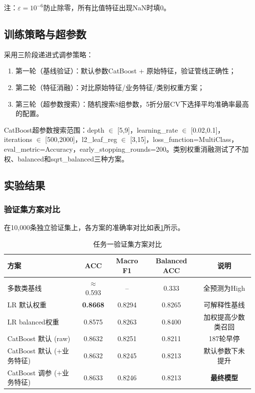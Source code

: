 注：$\varepsilon = 10^{-6}$防止除零，所有比值特征出现NaN时填0。

\subsection{训练策略与超参数}

采用三阶段递进式调参策略：
\begin{enumerate}[itemsep=0pt]
\item 第一轮（基线验证）：默认参数CatBoost + 原始特征，验证管线正确性；
\item 第二轮（特征消融）：对比原始特征/业务特征/类别权重方案；
\item 第三轮（超参数搜索）：随机搜索8组参数，5折分层CV下选择平均准确率最高的配置。
\end{enumerate}

CatBoost超参数搜索范围：depth $\in$ [5,9]，learning\_rate $\in$ [0.02,0.1]，iterations $\in$ [500,2000]，l2\_leaf\_reg $\in$ [3,15]，loss\_function=MultiClass，eval\_metric=Accuracy，early\_stopping\_rounds=200。类别权重消融测试了不加权、balanced和sqrt\_balanced三种方案。

\subsection{实验结果}

\subsubsection{验证集方案对比}

在10,000条独立验证集上，各方案的准确率对比如表\ref{tab:t1_results}所示。

\begin{table}[H]
\centering
\caption{任务一验证集方案对比}
\label{tab:t1_results}
\begin{tabular}{lcccc}
\toprule
\textbf{方案} & \textbf{ACC} & \textbf{Macro F1} & \textbf{Balanced ACC} & \textbf{说明} \\
\midrule
多数类基线 & $\approx$0.593 & -- & 0.333 & 全预测为High \\
LR 默认权重 & \textbf{0.8668} & 0.8294 & 0.8265 & 可解释性基线 \\
LR balanced权重 & 0.8575 & 0.8263 & 0.8400 & 加权提高少数类召回 \\
CatBoost 默认 (raw) & 0.8632 & 0.8251 & 0.8211 & 187轮早停 \\
CatBoost 默认 (+业务特征) & 0.8632 & 0.8245 & 0.8213 & 默认参数下未提升 \\
CatBoost 调参 (+业务特征) & 0.8633 & 0.8246 & 0.8213 & \textbf{最终模型} \\
\bottomrule
\end{tabular}
\end{table}

